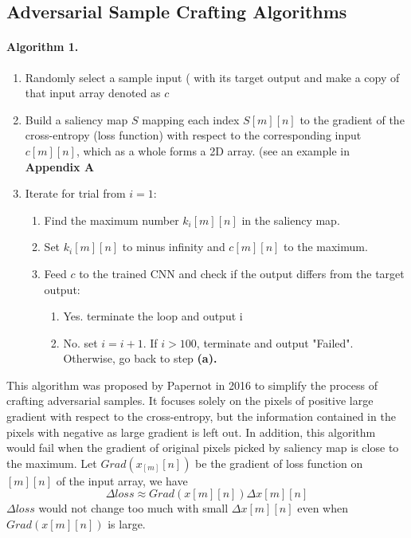 \documentclass{article}
\begin{document}
\subsection{Adversarial Sample Crafting Algorithms}
\paragraph{Algorithm 1.}
\begin{enumerate}

\item Randomly select a sample input ( with its target output and make a copy of that input array denoted as $c$

\item Build a saliency map $S$ mapping each index $S[m][n]$ to the gradient of the cross-entropy (loss function) with respect to the corresponding input$c[m][n]$, which as a whole forms a 2D array. (see an example in \textbf{Appendix A}

\item Iterate for trial from $i=1$:

\begin{enumerate}
	\item Find the maximum number $k_i[m][n]$ in the saliency map.

	\item Set $k_i[m][n]$ to minus infinity  and $c[m][n]$ to the maximum.

	\item Feed $c$ to the trained CNN and check if the output differs from the target output:
		\begin{enumerate}
			\item Yes. terminate the loop and output i
			\item No. set $i=i+1$. If $i > 100$, terminate and output "Failed". Otherwise, go back to step \textbf{(a).}
		\end{enumerate}
\end{enumerate}
\end{enumerate}
This algorithm was proposed by Papernot\cite{Papernot} in 2016 to simplify the process of crafting adversarial samples. It focuses solely on the pixels of positive large gradient with respect to the cross-entropy, but the information contained in the pixels with negative as large gradient is left out.
In addition, this algorithm would fail when the gradient of original pixels picked by saliency map is close to the maximum.\cite{Papernot2}
Let $Grad(x_[m][n])$ be the gradient of loss function on $[m][n]$ of the input array, we have 
\begin{equation}
	\Delta loss \approx Grad(x[m][n])\Delta x[m][n]
\end{equation}
$\Delta loss$ would not change too much with small $\Delta x[m][n]$ even when $Grad(x[m][n])$ is large.
\end{document}
